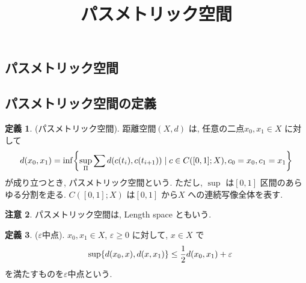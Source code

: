 \documentclass[platex, driver=dvipdfm, ja = standard, 10pt, fleqn, label-section=none]{bxjsarticle}
\title{パスメトリック空間}
\date{}
\author{}
\theoremstyle{definition}
\newtheorem{dfn}{定義}[section]
\newtheorem{remark}[dfn]{注意}
\newcommand{\veps}{\varepsilon}
\newcommand{\cbra}[1]{\mleft\{#1\mright\}}
\renewcommand{\;}{\, ; \,}
\begin{document}
\maketitle



\section{}

\subsection{パスメトリック空間}




\subsection{パスメトリック空間の定義} 

\begin{dfn}(パスメトリック空間). 距離空間$(X, d)$ は, 任意の二点$x_0, x_1 \in X$ に対して
\begin{align*} d(x_0, x_1) = \inf \cbra{ \sup_{\Pi} \sum d(c(t_i), c(t_{i+1} )  ) \mid c \in C([0,1]; X), c_0 = x_0, c_1 = x_1 }   \end{align*}
が成り立つとき, パスメトリック空間という. ただし, $\sup$ は$[0, 1]$ 区間のあらゆる分割を走る. $C([0,1]; X)$ は$[0,1]$ から$X$ への連続写像全体を表す. 
\end{dfn}

\begin{remark}
パスメトリック空間は, Length space ともいう. 
\end{remark}

\begin{dfn}($\veps$中点). $x_0, x_1 \in X$, $\veps \geq 0 $ に対して, $x \in X$ で 
\begin{align*} \quad  \sup \cbra{ d(x_0 ,  x) , d(x , x_1)} \leq \frac{1}{2} d(x_0, x_1) + \veps \end{align*}
 を満たすものを$\veps$中点という. 
\end{dfn}
\end{document}
